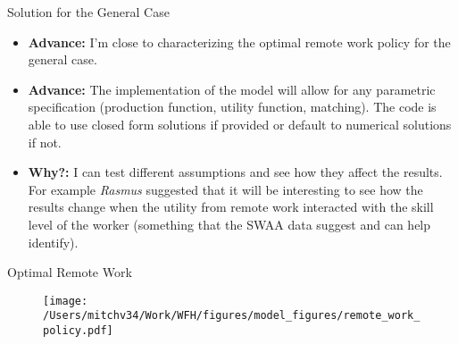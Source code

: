 \documentclass[aspectratio=1610]{beamer}
\begin{document}
\begin{frame}{Solution for the General Case}
    \begin{itemize}
        \item[] \textcolor{mygreen}{\textbf{Advance:}} I'm close to characterizing the optimal remote work policy for the general case.
        \pause
        \item[] \textcolor{mygreen}{\textbf{Advance:}} The implementation of the model will allow for any parametric specification (production function, utility function, matching). The code is able to use closed form solutions if provided or default to numerical solutions if not.
        \pause
        \item[] \textcolor{myorange}{\textbf{Why?:}} I can test different assumptions and see how they affect the results. For example \textit{Rasmus} suggested that it will be interesting to see how the results change when the utility from remote work interacted with the skill level of the worker (something that the SWAA data suggest and can help identify).
    \end{itemize}
\end{frame}
    
\begin{frame}{Optimal Remote Work}

\begin{figure}
    \centering
    \texttt{[image: /Users/mitchv34/Work/WFH/figures/model\_figures/remote\_work\_policy.pdf]}
    
\end{figure}
    
\end{frame}
\end{document}
